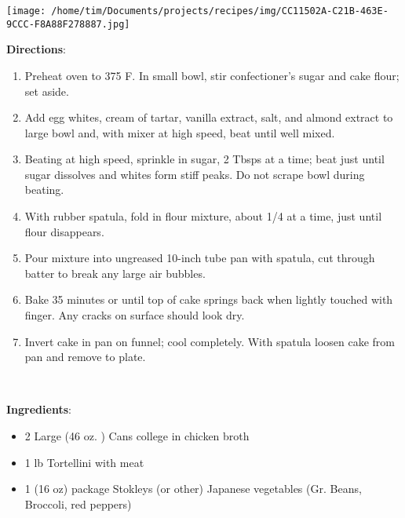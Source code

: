 \documentclass[11pt, twoside, openany]{book}
\begin{document}
\begin{minipage}[t]{0.2\linewidth}
\centering \strut\vspace*{-\baselineskip}\newline
\texttt{[image: /home/tim/Documents/projects/recipes/img/CC11502A-C21B-463E-9CCC-F8A88F278887.jpg]}\\
\end{minipage}\vspace{3mm}
\textbf{Directions}:
\vspace{-3mm}\begin{enumerate}\setlength\itemsep{-1mm}
\item Preheat oven to 375 F. In small bowl, stir confectioner's sugar and cake flour; set aside.
\item Add egg whites, cream of tartar, vanilla extract, salt, and almond extract to large bowl and, with mixer at high speed, beat until well mixed.
\item Beating at high speed, sprinkle in sugar, 2 Tbsps at a time; beat just until sugar dissolves and whites form stiff peaks. Do not scrape bowl during beating.
\item With rubber spatula, fold in flour mixture, about 1/4 at a time, just until flour disappears.
\item Pour mixture into ungreased 10-inch tube pan with spatula, cut through batter to break any large air bubbles.
\item Bake 35 minutes or until top of cake springs back when lightly touched with finger. Any cracks on surface should look dry.
\item Invert cake in pan on funnel; cool completely. With spatula loosen cake from pan and remove to plate.
\end{enumerate}
 \label{italian-christmas-soup}\hfill\textit{}\\
\begin{minipage}[t]{0.8\linewidth}
\textbf{Ingredients}:\vspace{-3mm}
\begin{multicols}{2}
\begin{itemize}\setlength\itemsep{-1mm}
\item 2 Large (46 oz. ) Cans college in chicken broth
\item 1 lb Tortellini with meat
\item 1 (16 oz) package Stokleys (or other) Japanese vegetables (Gr. Beans, Broccoli, red peppers)
\end{itemize}
\end{multicols}
\end{minipage}
\end{document}
